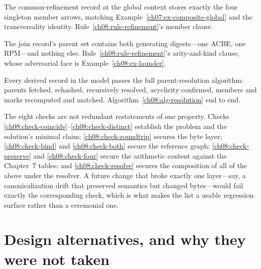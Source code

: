 \begin{checkclass}\label{ch08:check-four}
The common-refinement record at the global context stores exactly the four singleton member arrows, matching Example~\ref{ch07:ex-composite-global} and the transversality identity. Rule~\ref{ch08:rule-refinement}'s member clause.
\end{checkclass}

\begin{checkclass}\label{ch08:check-both}
The join record's parent set contains both generating digests---one ACBE, one RPM---and nothing else. Rule~\ref{ch08:rule-refinement}'s arity-and-kind clause, whose adversarial face is Example~\ref{ch08:ex-launder}.
\end{checkclass}

\begin{checkclass}\label{ch08:check-resolve}
Every derived record in the model passes the full parent-resolution algorithm: parents fetched, rehashed, recursively resolved, acyclicity confirmed, members and marks recomputed and matched. Algorithm~\ref{ch08:alg-resolution} end to end.
\end{checkclass}

\begin{remark}\label{ch08:rem-check-division}
The eight checks are not redundant restatements of one property. Checks \ref{ch08:check-coincide}--\ref{ch08:check-distinct} establish the problem and the solution's minimal claim; \ref{ch08:check-roundtrip} secures the byte layer; \ref{ch08:check-bind} and \ref{ch08:check-both} secure the reference graph; \ref{ch08:check-preserve} and \ref{ch08:check-four} secure the arithmetic content against the Chapter~7 tables; and \ref{ch08:check-resolve} secures the composition of all of the above under the resolver. A future change that broke exactly one layer---say, a canonicalization drift that preserved semantics but changed bytes---would fail exactly the corresponding check, which is what makes the list a usable regression surface rather than a ceremonial one.
\end{remark}

\section{Design alternatives, and why they were not taken}\label{ch08:sec-alternatives}

